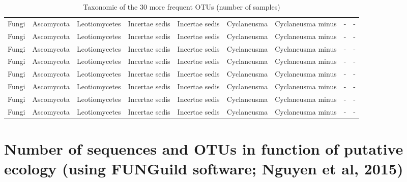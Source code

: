 \documentclass[12pt]{article}\usepackage[]{graphicx}\usepackage[]{color}
\numberwithin{figure}{section}
\begin{document}
\begin{landscape}
\begin{table}[ht]
\begin{tabular}{lllllllll}
  Fungi & Ascomycota & Leotiomycetes & Incertae sedis & Incertae sedis & Cyclaneusma & Cyclaneusma minus & - & - \\ 
  Fungi & Ascomycota & Leotiomycetes & Incertae sedis & Incertae sedis & Cyclaneusma & Cyclaneusma minus & - & - \\ 
  Fungi & Ascomycota & Leotiomycetes & Incertae sedis & Incertae sedis & Cyclaneusma & Cyclaneusma minus & - & - \\ 
  Fungi & Ascomycota & Leotiomycetes & Incertae sedis & Incertae sedis & Cyclaneusma & Cyclaneusma minus & - & - \\ 
  Fungi & Ascomycota & Leotiomycetes & Incertae sedis & Incertae sedis & Cyclaneusma & Cyclaneusma minus & - & - \\ 
  Fungi & Ascomycota & Leotiomycetes & Incertae sedis & Incertae sedis & Cyclaneusma & Cyclaneusma minus & - & - \\ 
  Fungi & Ascomycota & Leotiomycetes & Incertae sedis & Incertae sedis & Cyclaneusma & Cyclaneusma minus & - & - \\ 
  Fungi & Ascomycota & Leotiomycetes & Incertae sedis & Incertae sedis & Cyclaneusma & Cyclaneusma minus & - & - \\ 
   \hline
\end{tabular}
\endgroup
\caption{Taxonomie of the 30 more frequent OTUs (number of samples)} 
\end{table}

\end{landscape}


\section{Number of sequences and OTUs in function of putative ecology (using FUNGuild software; Nguyen et al, 2015)}
\end{document}
